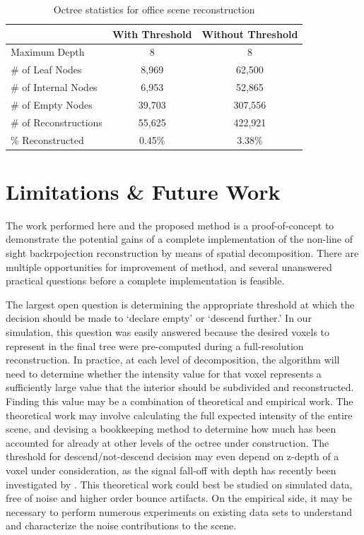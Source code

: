 \documentclass[conference]{IEEEtran}
\begin{document}
\begin{table}[]
\centering
\begin{tabular}{@{}lcc@{}}
\toprule
                          & With Threshold & Without Threshold \\ \midrule
Maximum Depth             & 8              & 8                 \\
\# of Leaf Nodes      & 8,969          & 62,500            \\
\# of Internal Nodes  & 6,953          & 52,865            \\
\# of Empty Nodes     & 39,703         & 307,556           \\
\# of Reconstructions & 55,625         & 422,921           \\
\% Reconstructed          & 0.45\%         & 3.38\%            \\ \bottomrule
\end{tabular}
\caption{Octree statistics for office scene reconstruction}
\label{tab:stats}
\end{table}

\section{Limitations \& Future Work}

The work performed here and the proposed method is a proof-of-concept to demonstrate the potential gains of a complete implementation of the non-line of sight backrpojection reconstruction by means of spatial decomposition. There are multiple opportunities for improvement of method, and several unanswered practical questions before a complete implementation is feasible. 

The largest open question is determining the appropriate threshold at which the decision should be made to `declare empty' or `descend further.' In our simulation, this question was easily answered because the desired voxels to represent in the final tree were pre-computed during a full-resolution reconstruction. In practice, at each level of decomposition, the algorithm will need to determine whether the intensity value for that voxel represents a sufficiently large value that the interior should be subdivided and reconstructed. Finding this value may be a combination of theoretical and empirical work. The theoretical work may involve calculating the full expected intensity of the entire scene, and devising a bookkeeping method to determine how much has been accounted for already at other levels of the octree under construction. The threshold for descend/not-descend decision may even depend on z-depth of a voxel under consideration, as the signal fall-off with depth has recently been investigated by \cite{Nam2020}. This theoretical work could best be studied on simulated data, free of noise and higher order bounce artifacts. On the empirical side, it may be necessary to perform numerous experiments on existing data sets to understand and characterize the noise contributions to the scene.
\end{document}
